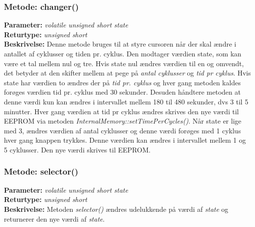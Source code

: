 \subsubsection{Metode: changer()}
\textbf{Parameter: } \textit{volatile unsigned short state}
\\ \textbf{Returtype: } \textit{unsigned short}
\\ \textbf{Beskrivelse: } Denne metode bruges til at styre cursoren når der skal ændre i antallet af cyklusser og tiden pr. cyklus. Den modtager værdien state, som kan være et tal mellem nul og tre. Hvis state nul ændres værdien til en og omvendt, det betyder at den skifter mellem at pege på \textit{antal cyklusser} og \textit{tid pr cyklus}. 
Hvis state har værdien to ændres der på \textit{tid pr. cyklus }og hver gang metoden kaldes forøges værdien tid pr. cyklus med 30 sekunder. Desuden håndtere metoden at denne værdi kun kan ændres i intervallet mellem 180 til 480 sekunder, dvs 3 til 5 minutter. Hver gang værdien at tid pr cyklus ændres skrives den nye værdi til EEPROM via metoden \textit{InternalMemory::setTimePerCycles()}. 
Når state er lige med 3, ændres værdien af antal cyklusser og denne værdi forøges med 1 cyklus hver gang knappen trykkes. Denne værdien kan ændres i intervallet mellem 1 og 5 cyklusser. Den nye værdi skrives til EEPROM. 

\subsubsection{Metode: selector()}
\textbf{Parameter: } \textit{volatile unsigned short state}
\\ \textbf{Returtype: } \textit{unsigned short}
\\ \textbf{Beskrivelse: } Metoden \textit{selector()} ændres udelukkende på værdi af \textit{state} og returnerer den nye værdi af \textit{state}. 
